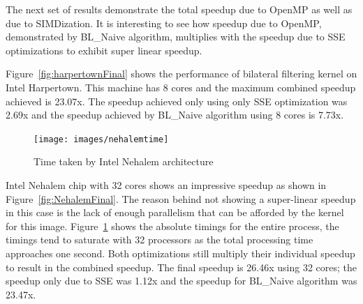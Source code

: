 \documentclass{IEEEtran}
\begin{document}
The next set of results demonstrate the total speedup due to OpenMP as well as due to SIMDization. It is interesting to see how speedup due to OpenMP, demonstrated by BL\_Naive algorithm,  multiplies with the speedup due to SSE optimizations to exhibit super linear speedup.

Figure~\ref{fig:harpertownFinal} shows the performance of bilateral filtering kernel on Intel Harpertown. This machine has 8 cores and the maximum combined speedup achieved is 23.07x. The speedup achieved only using only SSE optimization was 2.69x and the speedup achieved by BL\_Naive algorithm using 8 cores is 7.73x.

\begin{figure}
\centering
\texttt{[image: images/nehalemtime]}
\caption{Time taken by Intel Nehalem architecture}
\vspace{0mm}
\label{fig:nehalemtime}
\end{figure}
Intel Nehalem chip with 32 cores shows an impressive speedup as shown in Figure~\ref{fig:NehalemFinal}. The reason behind not showing a super-linear speedup in this case is the lack of enough parallelism that can be afforded by the kernel for this image. Figure~\ref{fig:nehalemtime} shows the absolute timings for the entire process, the timings tend to saturate with 32 processors as the total processing time approaches one second. Both optimizations still multiply their individual speedup to result in the combined speedup. The final speedup is 26.46x using 32 cores; the speedup only due to SSE was 1.12x and the speedup for BL\_Naive algorithm was 23.47x. 
\end{document}
